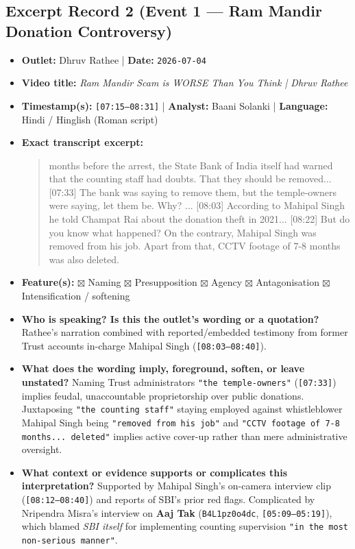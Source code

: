 \documentclass[10pt,a4paper]{article}
\begin{document}
\subsection*{Excerpt Record 2 (Event 1 --- Ram Mandir Donation Controversy)}
\begin{itemize}[leftmargin=1.5em, itemsep=3pt, topsep=4pt]
  \item \textbf{Outlet:} Dhruv Rathee | \textbf{Date:} \texttt{2026-07-04}
  \item \textbf{Video title:} \textit{Ram Mandir Scam is WORSE Than You Think | Dhruv Rathee}
  \item \textbf{Timestamp(s):} \texttt{[07:15--08:31]} | \textbf{Analyst:} Baani Solanki | \textbf{Language:} Hindi / Hinglish (Roman script)
  \item \textbf{Exact transcript excerpt:}
    \begin{quote}\small{} months before the arrest, the State Bank of India itself had warned that the counting staff had doubts. That they should be removed... [07:33] The bank was saying to remove them, but the temple-owners were saying, let them be. Why? ... [08:03] According to Mahipal Singh he told Champat Rai about the donation theft in 2021... [08:22] But do you know what happened? On the contrary, Mahipal Singh was removed from his job. Apart from that, CCTV footage of 7-8 months was also deleted.\end{quote}
  \item \textbf{Feature(s):} $\boxtimes$ Naming $\boxtimes$ Presupposition $\boxtimes$ Agency $\boxtimes$ Antagonisation $\boxtimes$ Intensification / softening
  \item \textbf{Who is speaking? Is this the outlet's wording or a quotation?} Rathee's narration combined with reported/embedded testimony from former Trust accounts in-charge Mahipal Singh (\texttt{[08:03--08:40]}).
  \item \textbf{What does the wording imply, foreground, soften, or leave unstated?} Naming Trust administrators \texttt{"the temple-owners"} (\texttt{[07:33]}) implies feudal, unaccountable proprietorship over public donations. Juxtaposing \texttt{"the counting staff"} staying employed against whistleblower Mahipal Singh being \texttt{"removed from his job"} and \texttt{"CCTV footage of 7-8 months... deleted"} implies active cover-up rather than mere administrative oversight.
  \item \textbf{What context or evidence supports or complicates this interpretation?} Supported by Mahipal Singh's on-camera interview clip (\texttt{[08:12--08:40]}) and reports of SBI's prior red flags. Complicated by Nripendra Misra's interview on \textbf{Aaj Tak} (\texttt{B4L1pz0o4dc}, \texttt{[05:09--05:19]}), which blamed \textit{SBI itself} for implementing counting supervision \texttt{"in the most non-serious manner"}.

\end{itemize}
\end{document}
